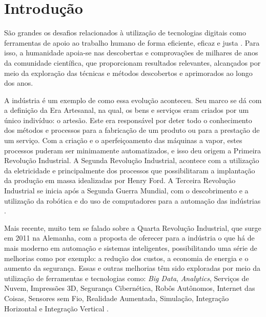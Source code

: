 \section{Introdução}
\label{sec:introducao}

São grandes os desafios relacionados à utilização de tecnologias digitais como ferramentas de apoio ao trabalho humano de forma eficiente, eficaz e justa \cite{Rose:2019}. Para isso, a humanidade apoia-se nas descobertas e comprovações de milhares de anos da comunidade científica, que proporcionam resultados relevantes, alcançados por meio da exploração das técnicas e métodos descobertos e aprimorados ao longo dos anos.

A indústria é um exemplo de como essa evolução aconteceu. Seu marco se dá com a definição da Era Artesanal, na qual, os bens e serviços eram criados por um único indivíduo: o artesão. Este era responsável por deter todo o conhecimento dos métodos e processos para a fabricação de um produto ou para a prestação de um serviço. Com a criação e o aperfeiçoamento das máquinas a vapor, estes processos puderam ser minimamente automatizados, e isso deu origem a Primeira Revolução Industrial. A Segunda Revolução Industrial, acontece com a utilização da eletricidade e principalmente dos processos que possibilitaram a implantação da produção em massa idealizadas por Henry Ford. A Terceira Revolução Industrial se inicia após a Segunda Guerra Mundial, com o descobrimento e a utilização da robótica e do uso de computadores para a automação das indústrias \cite{Souza:2017}.

Mais recente, muito tem se falado sobre a Quarta Revolução Industrial, que surge em 2011 na Alemanha, com a proposta de oferecer para a indústria o que há de mais moderno em automação e sistemas inteligentes, possibilitando uma série de melhorias como por exemplo: a redução dos custos, a economia de energia e o aumento da segurança. Essas e outras melhorias têm sido exploradas por meio da utilização de ferramentas e tecnologias como: \textit{Big Data}, \textit{Analytics}, Serviços de Nuvem, Impressões 3D, Segurança Cibernética, Robôs Autônomos, Internet das Coisas, Sensores sem Fio, Realidade Aumentada, Simulação, Integração Horizontal e Integração Vertical \cite{Souza:2017}.

